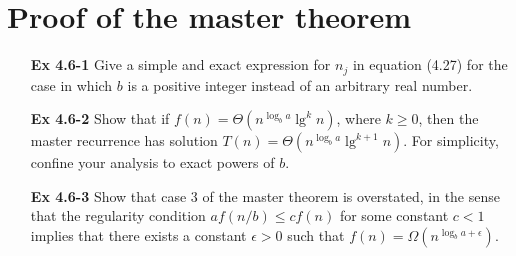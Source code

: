 \documentclass[fontsize=12pt,paper=a4]{book}
\begin{document}
\section{Proof of the master theorem}
\begin{enumerate}
	\item[\textbf{Ex 4.6-1}]
		Give a simple and exact expression for $n_j$ in equation (4.27) for the case in which $b$ is a positive integer instead of an arbitrary real number.
		
	\item[\textbf{Ex 4.6-2}]
		Show that if $f(n) = \Theta(n^{\log_b a} \lg^k n)$, where $k \geq 0$, then the master recurrence has solution $T(n) = \Theta(n^{\log_b a} \lg^{k+1} n)$. For simplicity, confine your analysis to exact powers of $b$.	
		
	\item[\textbf{Ex 4.6-3}]
		Show that case 3 of the master theorem is overstated, in the sense that the regularity condition $af(n/b) \leq cf(n)$ for some constant $c < 1$ implies that there exists a constant $\epsilon > 0$ such that $f(n) = \Omega(n^{\log_b a+ \epsilon})$.

\end{enumerate}
\end{document}
